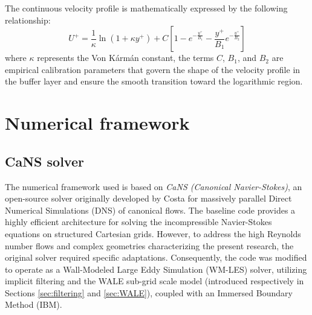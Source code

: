 \documentclass[12pt, a4paper, twoside, openright]{book}
\begin{document}
The continuous velocity profile is mathematically expressed by the following relationship:
\begin{equation}
    U^+ = \frac{1}{\kappa} \ln(1 + \kappa y^+) + C \left[ 1 - e^{-\frac{y^+}{B_1}} - \frac{y^+}{B_1} e^{-\frac{y^+}{B_2}} \right]
    \label{eq:reichardt}
\end{equation}
where $\kappa$ represents the Von Kármán constant, the terms $C$, $B_1$, and $B_2$ are empirical calibration parameters that govern the shape of the velocity profile in the buffer layer and ensure the smooth transition toward the logarithmic region.


\chapter{Numerical framework}
\label{sec:numerical-framework}
\section{CaNS solver}
The numerical framework used is based on \textit{CaNS (Canonical Navier-Stokes)}, an open-source solver originally developed by Costa \cite{cans-costa} for massively parallel Direct Numerical Simulations (DNS) of canonical flows. The baseline code provides a highly efficient architecture for solving the incompressible Navier-Stokes equations on structured Cartesian grids. However, to address the high Reynolds number flows and complex geometries characterizing the present research, the original solver required specific adaptations. Consequently, the code was modified to operate as a Wall-Modeled Large Eddy Simulation (WM-LES) solver, utilizing implicit filtering and the WALE sub-grid scale model (introduced respectively in Sections \ref{sec:filtering} and \ref{sec:WALE}), coupled with an Immersed Boundary Method (IBM).
\end{document}
